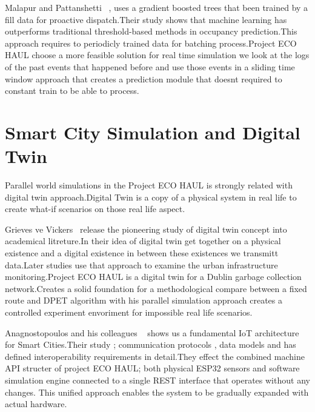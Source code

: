 \documentclass[12pt,a4paper]{report}
\begin{document}
\indent Malapur and Pattanshetti ~\cite{malapur2017}, uses a gradient boosted trees that been trained by a fill data for proactive dispatch.Their study shows that machine learning has outperforms traditional threshold-based methods in occupancy prediction.This approach requires to periodicly trained data for batching process.Project ECO HAUL choose a more feasible solution for real time simulation we look at the logs of the past events that happened before  and use those events in a sliding time window approach that creates a prediction module that doesnt required to constant train to be able to process.

\section{Smart City Simulation and Digital Twin}


\indent Parallel world simulations  in the Project ECO HAUL is strongly related with digital twin approach.Digital Twin is a copy of a physical system in real life to create what-if scenarios on those real life aspect.


\indent Grieves ve Vickers~\cite{grieves2017} release the pioneering study of digital twin concept into academical litreture.In their idea of digital twin get together on a physical existence and a digital existence in between these existences we transmitt data.Later studies use that approach to examine the urban infrastructure monitoring.Project ECO HAUL is a digital twin for a Dublin garbage collection network.Creates a solid foundation for a methodological compare between a fixed route and DPET algorithm with his parallel simulation approach creates a controlled experiment envoriment for impossible real life scenarios.

\indent Anagnostopoulos and his colleagues  ~\cite{zanella2014} shows us a fundamental IoT architecture for  Smart Cities.Their study  ; communication protocols , data models and has defined interoperability requirements in detail.They effect the combined machine API structer of project ECO HAUL; both physical ESP32 sensors and software simulation engine  connected to  a single REST interface that operates without any changes. This unified approach enables the system to be gradually expanded with actual hardware.
\end{document}
